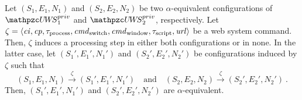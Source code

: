   \begin{lemma}\label{lemma:step-config-private}
    Let $(S_1,E_1,N_1)$ and $(S_2,E_2,N_2)$ be two 
    $\alpha$-equivalent configurations of 
    $\uppressoprivwebsystem_1$ and $\uppressoprivwebsystem_2$, 
    respectively. Let $\zeta = \langle\mathit{ci},\mathit{cp}, 
    \tau_\text{process}, \mathit{cmd}_\text{switch}, 
    \mathit{cmd}_\text{window},\tau_\text{script},\mathit{url}\rangle$
    be a web system command. Then, $\zeta$ induces a processing 
    step in either both configurations or in none. In the latter 
    case, let $(S_1',E_1',N_1')$ and $(S_2',E_2',N_2')$ be 
    configurations induced by $\zeta$ such that
    \[(S_1,E_1,N_1) \xrightarrow{\zeta} (S_1',E_1',N_1') \quad 
    \text{and} \quad (S_2,E_2,N_2) \xrightarrow{\zeta} 
    (S_2',E_2',N_2') \ .\]
    Then, $(S_1',E_1',N_1')$ and $(S_2',E_2',N_2')$ are
    $\alpha$-equivalent.  
  \end{lemma}
